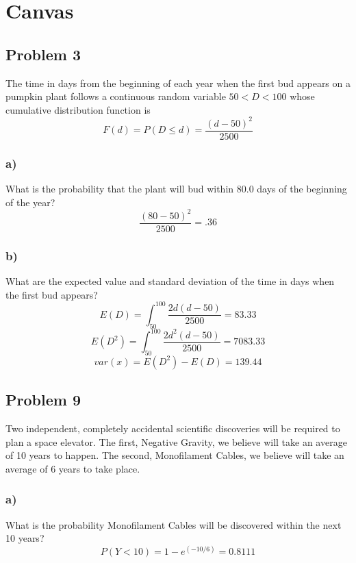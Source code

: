 \documentclass{article}
\begin{document}
\section*{Canvas}
\subsection*{Problem 3}
The time in days from the beginning of each year when the first bud appears on a pumpkin plant follows a continuous random variable $50< D<100$ whose cumulative distribution function is
\begin{equation}
    F(d) = P(D \leq d) = \frac{(d - 50)^2}{2500}
\end{equation}
\subsubsection*{a)}
What is the probability that the plant will bud within 80.0 days of the beginning of the year?
\begin{equation}
    \frac{(80-50)^2}{2500} = \boxed{.36}
\end{equation}
\subsubsection*{b)}
What are the expected value and standard deviation of the time in days when the first bud appears?
\begin{equation}
    E(D) = \int_{50}^{100} \frac{2d(d-50)}{2500} = 83.33
\end{equation}
\begin{equation}
    E(D^2) = \int_{50}^{100} \frac{2d^2(d-50)}{2500} = 7083.33
\end{equation}
\begin{equation}
    var(x) = E(D^2) - E(D) = \boxed{139.44}
\end{equation}
\subsection*{Problem 9}
Two independent, completely accidental scientific discoveries will be required to plan a space elevator. The first, Negative Gravity, we believe will take an average of 10 years to happen. The second, Monofilament Cables, we believe will take an average of 6 years to take place.
\subsubsection*{a)}
What is the probability Monofilament Cables will be discovered within the next 10 years?
\begin{equation}
    P(Y < 10) = 1 - e^{(-10/6)} = \boxed{0.8111}
\end{equation}
\end{document}
